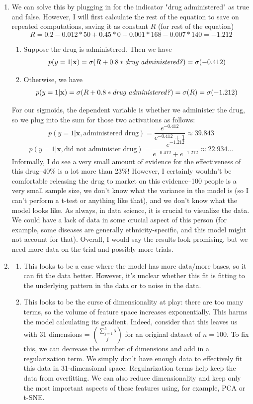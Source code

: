 \documentclass[submit]{harvardml}
\newenvironment{ans}{
  \begin{enumerate}
  \color{blue}
}{
  \end{enumerate}
  \color{black}
}
\begin{document}
\newpage
\begin{ans}
    \item We can solve this by plugging in for the indicator "drug administered" as true and false. However, I will first calculate the rest of the equation to save on repeated computations, saving it as constant $R$ (for rest of the equation)
    $$
    R = 0.2 - 0.012 *50 + 0.45*0 +  0.001*168 - 0.007*140 = -1.212
    $$
    \begin{enumerate}
        \item Suppose the drug is administered. Then we have
        $$
        p(y=1 | \mathbf{x}) = \sigma(R + 0.8 *\text{\textit{drug administered?}}) = \sigma(-0.412)
        $$
        \item Otherwise, we have 
        $$
        p(y=1 | \mathbf{x}) = \sigma(R + 0.8 *\text{\textit{drug administered?}}) = \sigma(R) = \sigma(-1.212)
        $$
    \end{enumerate}
    For our sigmoids, the dependent variable is whether we administer the drug, so we plug into the sum for those two activations as follows:
    $$
    p(y = 1 | \mathbf x, \text{administered drug}) = \frac{e^{-0.412}}{e^{-0.412} + 1} \approx 39.843%
    $$
    $$
    p(y = 1 | \mathbf x, \text{did not administer drug}) = \frac{e^{-1.212}}{e^{-0.412} + e^{-1.212}} \approx 22.934\dots %
    $$
    Informally, I do see a very small amount of evidence for the effectiveness of this drug--40\% is a lot more than 23\%! However, I certainly wouldn't be comfortable releasing the drug to market on this evidence--100 people is a very small sample size, we don't know what the variance in the model is (so I can't perform a t-test or anything like that), and we don't know what the model looks like. As always, in data science, it is crucial to visualize the data. We could have a lack of data in some crucial aspect of this person (for example, some diseases are generally ethnicity-specific, and this model might not account for that). Overall, I would say the results look promising, but we need more data on the trial and possibly more trials. 
    \item 
    \begin{enumerate}
        \item This looks to be a case where the model has more data/more bases, so it can fit the data better. However, it's unclear whether this fit is fitting to the underlying pattern in the data or to noise in the data. 
        \item This looks to be the curse of dimensionality at play: there are too many terms, so the volume of feature space increases exponentially. This harms the model calculating its gradient. Indeed, consider that this leaves us with 31 dimensions = $\sum_{j = 1}^5 5 \choose j$ for an original dataset of $n = 100$. To fix this, we can decrease the number of dimensions and add in a regularization term. We simply don't have enough data to effectively fit this data in 31-dimensional space. Regularization terms help keep the data from overfitting. We can also reduce dimensionality and keep only the most important aspects of these features using, for example, PCA or t-SNE. 

\end{enumerate}
\end{ans}
\end{document}
